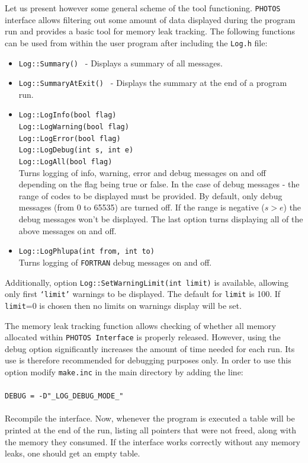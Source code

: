 \documentclass[]{Photos_interface_design}
\begin{document}
Let us present however some general scheme of the tool functioning.
{\tt PHOTOS} interface allows filtering out some amount of data displayed during the program run
and provides a basic tool for memory leak tracking. The following functions
can be used from within the user program after including the {\tt Log.h} file:
\begin{itemize}
  \item {\tt Log::Summary() } - Displays a summary of all messages.
  \item {\tt Log::SummaryAtExit() } - Displays the summary at the end of a program run.
  \item {\tt Log::LogInfo(bool flag) } \\
        {\tt Log::LogWarning(bool flag) } \\
        {\tt Log::LogError(bool flag) } \\
        {\tt Log::LogDebug(int s, int e) } \\
        {\tt Log::LogAll(bool flag)} \\
        Turns logging of info, warning, error and debug messages on and off depending
        on the flag being true or false. In the case of debug messages - the range of codes
        to be displayed must be provided. By default, only debug messages
        (from 0 to 65535) are turned off. If the range is negative ($s>e$) the debug messages
        won't be displayed. The last option turns displaying all of the above messages on and off.
  \item {\tt Log::LogPhlupa(int from, int to) } \\
        Turns logging of {\tt FORTRAN} debug messages on and off.
\end{itemize}

Additionally, option {\tt Log::SetWarningLimit(int limit)} is available, allowing
only first {\tt `limit'} warnings to be displayed. The default for {\tt limit} is 100. 
If {\tt limit}=0 is chosen then no limits on warnings display will be set.

The memory leak tracking function allows checking of whether all memory allocated within {\tt PHOTOS Interface}
 is properly released. However, using the debug option significantly increases the amount of time needed for 
each run. Its  use is therefore recommended  for debugging purposes only. In order to use this option
 modify {\tt make.inc} in the main directory by adding the line: \\
\\ {\tt DEBUG = -D"\_LOG\_DEBUG\_MODE\_" } \\ \\
Recompile the interface.
Now, whenever the program is executed a table will be printed at the end of the run,
listing all pointers that were not freed, along with the memory they consumed.
If the interface works correctly without any memory leaks, one should get an empty table.
\end{document}
